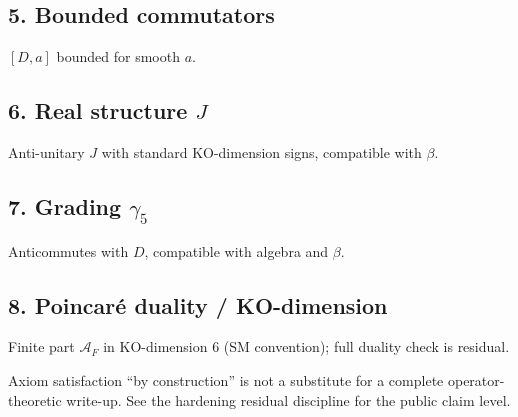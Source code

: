 \documentclass[11pt,a4paper]{article}
\begin{document}
\subsection{5. Bounded commutators}
$[D,a]$ bounded for smooth $a$.

\subsection{6. Real structure $J$}
Anti-unitary $J$ with standard KO-dimension signs, compatible with $\beta$.

\subsection{7. Grading $\gamma_5$}
Anticommutes with $D$, compatible with algebra and $\beta$.

\subsection{8. Poincar\'e duality / KO-dimension}
Finite part $\mathcal{A}_F$ in KO-dimension 6 (SM convention); full duality check is residual.

\begin{remark}
Axiom satisfaction ``by construction'' is not a substitute for a complete operator-theoretic write-up. See the hardening residual discipline for the public claim level.
\end{remark}
\end{document}

